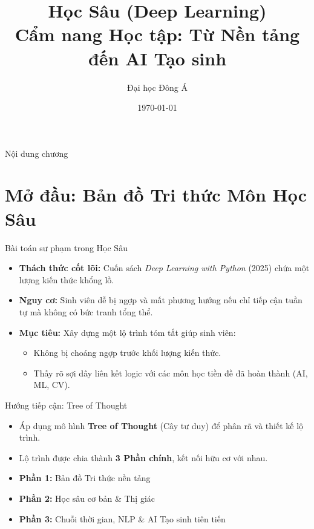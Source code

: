 \documentclass[aspectratio=169]{beamer}
\title[Tổng quan Học Sâu]{Học Sâu (Deep Learning) \\ \vspace{0.5cm} \Large Cẩm nang Học tập: Từ Nền tảng đến AI Tạo sinh}
\author{Đại học Đông Á}
\date{\today}
\begin{document}
\begin{frame}
    \titlepage
\end{frame}

\begin{frame}{Nội dung chương}
    \tableofcontents[hideallsubsections]
\end{frame}

\section{Mở đầu: Bản đồ Tri thức Môn Học Sâu}

\begin{frame}{Bài toán sư phạm trong Học Sâu}
    \begin{itemize}
        \item \textbf{Thách thức cốt lõi:} Cuốn sách \textit{Deep Learning with Python} (2025) chứa một lượng kiến thức khổng lồ.
        \item \textbf{Nguy cơ:} Sinh viên dễ bị ngợp và mất phương hướng nếu chỉ tiếp cận tuần tự mà không có bức tranh tổng thể.
        \item \textbf{Mục tiêu:} Xây dựng một lộ trình tóm tắt giúp sinh viên:
        \begin{itemize}
            \item Không bị choáng ngợp trước khối lượng kiến thức.
            \item Thấy rõ sợi dây liên kết logic với các môn học tiền đề đã hoàn thành (AI, ML, CV).
        \end{itemize}
    \end{itemize}
\end{frame}

\begin{frame}{Hướng tiếp cận: Tree of Thought}
    \begin{itemize}
        \item Áp dụng mô hình \textbf{Tree of Thought} (Cây tư duy) để phân rã và thiết kế lộ trình.
        \item Lộ trình được chia thành \textbf{3 Phần chính}, kết nối hữu cơ với nhau.
    \end{itemize}
    \begin{center}
        \begin{tcolorbox}[width=0.8\textwidth, colback=blue!5, colframe=blue!40!black, title=Bản đồ Tri thức]
            \begin{itemize}
                \item \textbf{Phần 1:} Bản đồ Tri thức nền tảng
                \item \textbf{Phần 2:} Học sâu cơ bản \& Thị giác
                \item \textbf{Phần 3:} Chuỗi thời gian, NLP \& AI Tạo sinh tiên tiến
            \end{itemize}
        \end{tcolorbox}
    \end{center}
\end{frame}
\end{document}
